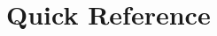 \documentclass[a4paper, justified, twoside, notoc]{tufte-book}
\begin{document}
\backmatter

\chapter{Quick Reference}


\printindex

\clearpage
\begin{titlepage}
  
\end{titlepage}
\end{document}
